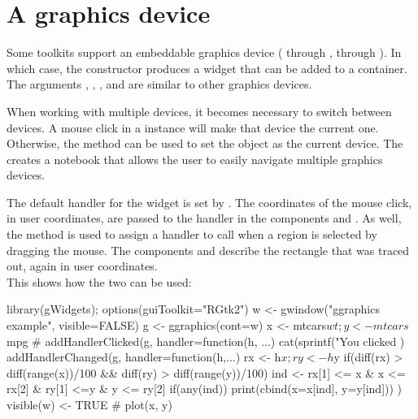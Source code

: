 \section{A graphics device}
\label{sec:gWidgets-graphics-device}

Some toolkits support an embeddable graphics device (
through ,  through ). In which case, the 
constructor produces a widget that can be added to a container. The
arguments , ,
, and  are similar to
other graphics devices.

When working with multiple devices, it becomes necessary to switch
between devices. A mouse click in a  instance will
make that device the current one. Otherwise, the
 method can be used to set the
object as the current device.  The 
creates a notebook that allows the user to easily navigate multiple
graphics devices.




The default handler for the widget is set by
. The coordinates of the mouse
click, in user coordinates, are passed to the handler in the
components  and . As well, the method
 is used to assign a handler to
call when a region is selected by dragging the mouse. The components
 and  describe the rectangle that was traced out,
again in user coordinates.
\\

This shows how the two can be used:
\begin{Schunk}
\begin{Sinput}
 library(gWidgets); options(guiToolkit="RGtk2")
 w <- gwindow("ggraphics example", visible=FALSE)
 g <- ggraphics(cont=w)
 x <- mtcars$wt; y <- mtcars$mpg
 #
 addHandlerClicked(g, handler=function(h, ...) {
   cat(sprintf("You clicked %
 })
 addHandlerChanged(g, handler=function(h,...) {
   rx <- h$x; ry <- h$y
   if(diff(rx) > diff(range(x))/100 && 
      diff(ry) > diff(range(y))/100) {
     ind <- rx[1] <= x & x <= rx[2] & ry[1] <=y & y <= ry[2]
     if(any(ind))
       print(cbind(x=x[ind], y=y[ind]))
   }
 })
 visible(w) <- TRUE
 #
 plot(x, y)
\end{Sinput}
\end{Schunk}
%

